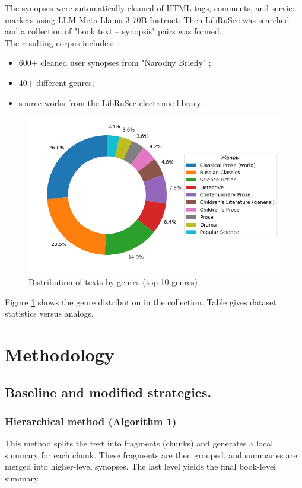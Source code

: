 \documentclass{superfri}
\begin{document}
The synopses were automatically cleaned of HTML tags, comments, and service markers using LLM Meta-\allowbreak Llama 3-\allowbreak 70B-\allowbreak Instruct.
Then LibRuSec was searched and a collection of "book text – synopsis" pairs was formed.
\\The resulting corpus includes:
\begin{itemize}
  \item 600+ cleaned user synopses from "Narodny Briefly" \cite{Briefly};
  \item 40+ different genres;
  \item source works from the LibRuSec electronic library \cite{librusec}.
\end{itemize}
\begin{figure}[!htbp]
    \centering
    \includegraphics[width=0.8\linewidth]{figures/genres_pie.png}
    \caption{Distribution of texts by genres (top 10 genres)}
    \label{fig:genres}
\end{figure}
Figure \ref{fig:genres} shows the genre distribution in the collection. Table  gives dataset statistics versus analogs.

\section{Methodology}
\subsection{Baseline and modified strategies.}

\subsubsection{Hierarchical method (Algorithm 1)}
This method \cite{hierarchical} splits the text into fragments (chunks) and
generates a local summary for each chunk.
These fragments are then grouped, and summaries are merged into higher-level synopses.
The last level yields the final book-level summary.
\end{document}

